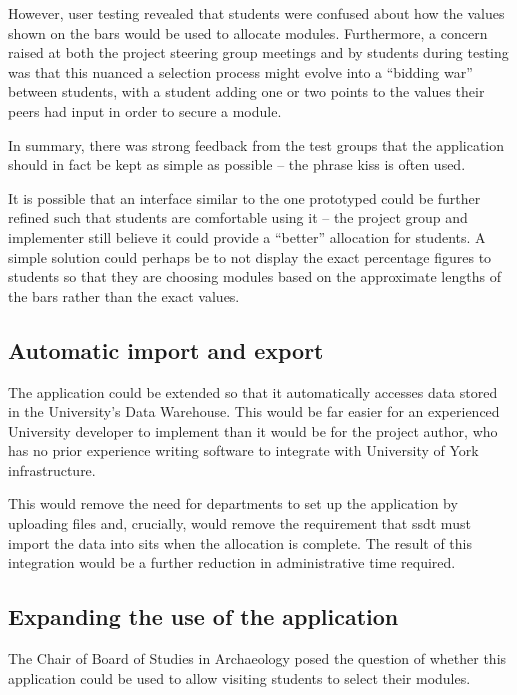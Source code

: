 \documentclass[draft]{scrartcl}
\begin{document}
However, user testing revealed that students were confused about how the
values shown on the bars would be used to allocate modules. Furthermore, a
concern raised at both the project steering group meetings and by students
during testing was that this nuanced a selection process might evolve into a
``bidding war'' between students, with a student adding one or two points to
the values their peers had input in order to secure a module.

In summary, there was strong feedback from the test groups that the
application should in fact be kept as simple as possible -- the phrase
\gls{kiss} is often used.

It is possible that an interface similar to the one prototyped could be
further refined such that students are comfortable using it -- the project
group and implementer still believe it could provide a ``better'' allocation
for students. A simple solution could perhaps be to not display the exact
percentage figures to students so that they are choosing modules based on the
approximate lengths of the bars rather than the exact values.

\subsection{Automatic import and export}
\label{sec:autoexport}

The application could be extended so that it automatically accesses data
stored in the University's Data Warehouse. This would be far easier for an
experienced University developer to implement than it would be for the project
author, who has no prior experience writing software to integrate with
University of York infrastructure.

This would remove the need for departments to set up the application by
uploading files and, crucially, would remove the requirement that \gls{ssdt}
must import the data into \gls{sits} when the allocation is complete. The
result of this integration would be a further reduction in administrative time
required.

\subsection{Expanding the use of the application}

The Chair of Board of Studies in Archaeology posed the question of whether
this application could be used to allow visiting students to select their
modules.
\end{document}
